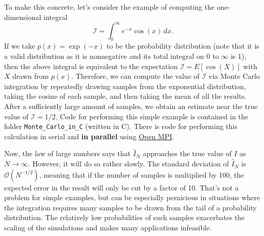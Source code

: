 \documentclass[12pt]{scrartcl}
\begin{document}
To make this concrete, let's consider the example of computing the one-dimensional integral
%
\begin{equation}
\label{e:MC_ex}
\mathcal{I}=\int_{0}^\infty e^{-x} \cos(x)\,dx.
\end{equation}
%
If we take $p(x)=\exp(-x)$ to be the probability distribution (note that it is a valid distribution as it is nonnegative and its total integral on 0 to $\infty$ is 1), then the above integral is equivalent to the expectation $\mathcal{I}=E[\cos(X)]$ with $X$ drawn from $p(x)$. Therefore, we can compute the value of $\mathcal{I}$ via Monte Carlo integration by repeatedly drawing samples from the exponential distribution, taking the cosine of each sample, and then taking the mean of all the results. After a sufficiently large amount of samples, we obtain an estimate near the true value of $\mathcal{I}=1/2$. Code for performing this simple example is contained in the folder \texttt{Monte\_Carlo\_in\_C} (written in C). There is code for performing this calculation in serial and \textbf{in parallel} using \href{https://www.open-mpi.org/}{Open MPI}.

Now, the law of large numbers says that $\hat{I}_N$ approaches the true value of $I$ as $N \rightarrow \infty$. However, it will do so rather slowly. The standard deviation of $\hat{I}_N$ is $\mathcal{O}(N^{-1/2})$, meaning that if the number of samples is multiplied by 100, the expected error in the result will only be cut by a factor of 10. That's not a problem for simple examples, but can be especially pernicious in situations where the integration requires many samples to be drawn from the tail of a probability distribution. The relatively low probabilities of such samples exacerbates the scaling of the simulations and makes many applications infeasible. 
\end{document}
